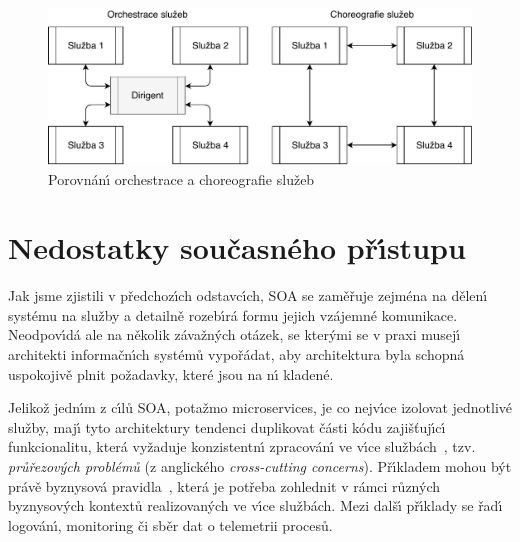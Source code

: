 \begin{figure}
    \centering
    \includegraphics[keepaspectratio=true, width=0.8\linewidth]{figures/choreography-orchestration.pdf}
    \caption{Porovnán\'{\i} orchestrace a choreografie služeb~\cite{cerny2017disambiguation}}
    \label{fig:choreography-orchestration}
\end{figure}

\section{Nedostatky současného př\'{\i}stupu}\label{sec:shortcomings}

Jak jsme zjistili v předchoz\'{\i}ch odstavc\'{\i}ch, \gls{SOA} se zaměřuje zejména na
dělen\'{\i} systému na služby a detailně rozeb\'{\i}rá formu jejich vzájemné komunikace.
Neodpov\'{\i}dá ale na několik závažn\'ych otázek, se kter\'ymi se v praxi musej\'{\i}
architekti informačn\'{\i}ch systémů vypořádat, aby architektura byla schopná uspokojivě
plnit požadavky, které jsou na n\'{\i} kladené.

Jelikož jedn\'{\i}m z c\'{\i}lů \gls{SOA}, potažmo microservices, je co nejv\'{\i}ce izolovat
jednotlivé služby, maj\'{\i} tyto architektury tendenci duplikovat části kódu
zajišťuj\'{\i}c\'{\i} funkcionalitu, která vyžaduje konzistentn\'{\i} zpracován\'{\i} ve v\'{\i}ce
službách~\cite{cerny2017disambiguation}, tzv. \textit{průřezov\'ych
problémů} (z anglického \textit{cross-cutting concerns}).
Př\'{\i}kladem mohou b\'yt právě byznysová pravidla~\cite{cemus2014aspect}, která je potřeba
zohlednit v rámci různ\'ych byznysov\'ych kontextů realizovan\'ych ve v\'{\i}ce službách.
Mezi dalš\'{\i} př\'{\i}klady se řad\'{\i} logován\'{\i}, monitoring či sběr dat
o telemetrii procesů.

